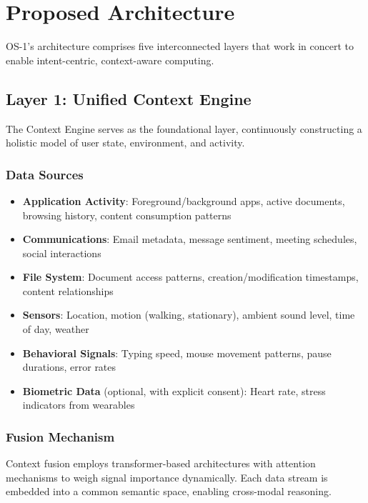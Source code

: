 \documentclass[conference]{IEEEtran}
\begin{document}
\section{Proposed Architecture}

OS-1's architecture comprises five interconnected layers that work in concert to enable intent-centric, context-aware computing.

\subsection{Layer 1: Unified Context Engine}

The Context Engine serves as the foundational layer, continuously constructing a holistic model of user state, environment, and activity.

\subsubsection{Data Sources}

\begin{itemize}
\item \textbf{Application Activity}: Foreground/background apps, active documents, browsing history, content consumption patterns
\item \textbf{Communications}: Email metadata, message sentiment, meeting schedules, social interactions
\item \textbf{File System}: Document access patterns, creation/modification timestamps, content relationships
\item \textbf{Sensors}: Location, motion (walking, stationary), ambient sound level, time of day, weather
\item \textbf{Behavioral Signals}: Typing speed, mouse movement patterns, pause durations, error rates
\item \textbf{Biometric Data} (optional, with explicit consent): Heart rate, stress indicators from wearables
\end{itemize}

\subsubsection{Fusion Mechanism}

Context fusion employs transformer-based architectures \cite{vaswani2017attention} with attention mechanisms to weigh signal importance dynamically. Each data stream is embedded into a common semantic space, enabling cross-modal reasoning.
\end{document}
